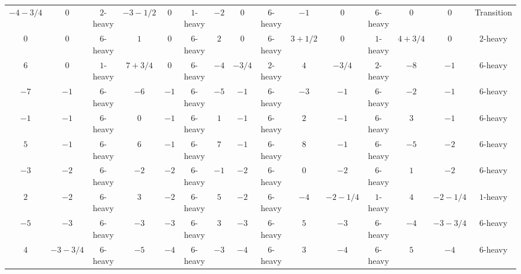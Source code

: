 \begin{table}[!bht]
{\begin{tabular}{@{}ccccccccccccccc@{}}
$-4-3/4$ & $0$ & \multicolumn{1}{c|}{$2$-heavy} & $-3-1/2$ & $0$ & \multicolumn{1}{c|}{$1$-heavy} & $-2$ & $0$ & \multicolumn{1}{c|}{$6$-heavy} & $-1$ & $0$ & \multicolumn{1}{c|}{$6$-heavy} & $0$ & $0$ & Transition \\
$0$ & $0$ & \multicolumn{1}{c|}{$6$-heavy} & $1$ & $0$ & \multicolumn{1}{c|}{$6$-heavy} & $2$ & $0$ & \multicolumn{1}{c|}{$6$-heavy} & $3+1/2$ & $0$ & \multicolumn{1}{c|}{$1$-heavy} & $4+3/4$ & $0$ & $2$-heavy \\
$6$ & $0$ & \multicolumn{1}{c|}{$1$-heavy} & $7+3/4$ & $0$ & \multicolumn{1}{c|}{$6$-heavy} & $-4$ & $-3/4$ & \multicolumn{1}{c|}{$2$-heavy} & $4$ & $-3/4$ & \multicolumn{1}{c|}{$2$-heavy} & $-8$ & $-1$ & $6$-heavy \\
$-7$ & $-1$ & \multicolumn{1}{c|}{$6$-heavy} & $-6$ & $-1$ & \multicolumn{1}{c|}{$6$-heavy} & $-5$ & $-1$ & \multicolumn{1}{c|}{$6$-heavy} & $-3$ & $-1$ & \multicolumn{1}{c|}{$6$-heavy} & $-2$ & $-1$ & $6$-heavy \\
$-1$ & $-1$ & \multicolumn{1}{c|}{$6$-heavy} & $0$ & $-1$ & \multicolumn{1}{c|}{$6$-heavy} & $1$ & $-1$ & \multicolumn{1}{c|}{$6$-heavy} & $2$ & $-1$ & \multicolumn{1}{c|}{$6$-heavy} & $3$ & $-1$ & $6$-heavy \\
$5$ & $-1$ & \multicolumn{1}{c|}{$6$-heavy} & $6$ & $-1$ & \multicolumn{1}{c|}{$6$-heavy} & $7$ & $-1$ & \multicolumn{1}{c|}{$6$-heavy} & $8$ & $-1$ & \multicolumn{1}{c|}{$6$-heavy} & $-5$ & $-2$ & $6$-heavy \\
$-3$ & $-2$ & \multicolumn{1}{c|}{$6$-heavy} & $-2$ & $-2$ & \multicolumn{1}{c|}{$6$-heavy} & $-1$ & $-2$ & \multicolumn{1}{c|}{$6$-heavy} & $0$ & $-2$ & \multicolumn{1}{c|}{$6$-heavy} & $1$ & $-2$ & $6$-heavy \\
$2$ & $-2$ & \multicolumn{1}{c|}{$6$-heavy} & $3$ & $-2$ & \multicolumn{1}{c|}{$6$-heavy} & $5$ & $-2$ & \multicolumn{1}{c|}{$6$-heavy} & $-4$ & $-2-1/4$ & \multicolumn{1}{c|}{$1$-heavy} & $4$ & $-2-1/4$ & $1$-heavy \\
$-5$ & $-3$ & \multicolumn{1}{c|}{$6$-heavy} & $-3$ & $-3$ & \multicolumn{1}{c|}{$6$-heavy} & $3$ & $-3$ & \multicolumn{1}{c|}{$6$-heavy} & $5$ & $-3$ & \multicolumn{1}{c|}{$6$-heavy} & $-4$ & $-3-3/4$ & $6$-heavy \\
$4$ & $-3-3/4$ & \multicolumn{1}{c|}{$6$-heavy} & $-5$ & $-4$ & \multicolumn{1}{c|}{$6$-heavy} & $-3$ & $-4$ & \multicolumn{1}{c|}{$6$-heavy} & $3$ & $-4$ & \multicolumn{1}{c|}{$6$-heavy} & $5$ & $-4$ & $6$-heavy \\ \bottomrule
\end{tabular}%
}
\end{table}


